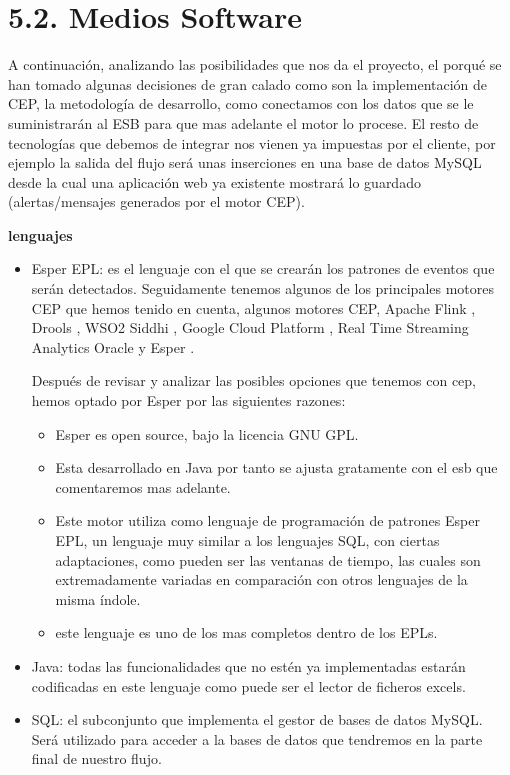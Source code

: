 \documentclass[a4paper]{article}
\begin{document}
\section{5.2. Medios Software}

A continuación, analizando las posibilidades que nos da el proyecto, el porqué se han tomado algunas decisiones de gran calado como son la implementación de CEP, la metodología de desarrollo, como conectamos con los datos que se le suministrarán al ESB para que mas adelante el motor lo procese. El resto de tecnologías que debemos de integrar nos vienen ya impuestas por el cliente, por ejemplo la salida del flujo será unas inserciones en una base de datos MySQL desde la cual una aplicación web ya existente mostrará lo guardado (alertas/mensajes generados por el motor CEP).

\textbf{lenguajes}
\begin{itemize}
\item Esper EPL: es el lenguaje con el que se crearán los patrones de eventos que serán detectados. Seguidamente tenemos algunos de los principales motores CEP que hemos tenido en cuenta, algunos motores CEP, Apache Flink \cite{webFlink}, Drools \cite{webDrools}, WSO2 Siddhi \cite{webSiddhi} \cite{webSiddhi1}, Google Cloud Platform \cite{webGCP}, Real Time Streaming Analytics Oracle \cite{webOracleCEP} y Esper \cite{webEsper}.
      
      Después de revisar y analizar las posibles opciones que tenemos con cep, hemos optado por Esper por las siguientes razones:
      \begin{itemize}
      \item Esper es open source, bajo la licencia GNU GPL.
      \item Esta desarrollado en Java por tanto se ajusta gratamente con el esb que comentaremos mas adelante.
      \item Este motor utiliza como lenguaje de programación de patrones Esper EPL, un lenguaje muy similar a los lenguajes SQL, con ciertas adaptaciones, como pueden ser las ventanas de tiempo, las cuales son extremadamente variadas en comparación con otros lenguajes de la misma índole.
      \item este lenguaje es uno de los mas completos dentro de los EPLs.
      \end{itemize}

\item Java: todas las funcionalidades que no estén ya implementadas estarán codificadas en este lenguaje como puede ser el lector de ficheros excels.
\item SQL: el subconjunto que implementa el gestor de bases de datos MySQL. Será utilizado para acceder a la bases de datos que tendremos en la parte final de nuestro flujo.
\end{itemize}
\end{document}
